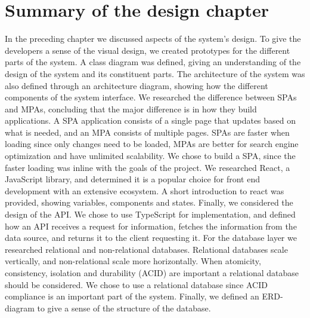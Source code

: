 \section{Summary of the design chapter}
In the preceding chapter we discussed aspects of the system's design.
To give the developers a sense of the visual design, we created prototypes for the different parts of the system.
A class diagram was defined, giving an understanding of the design of the system and its constituent parts.
The architecture of the system was also defined through an architecture diagram, showing how the different components of the system interface.
We researched the difference between SPAs and MPAs, concluding that the major difference is in how they build applications.
A SPA application consists of a single page that updates based on what is needed, and an MPA consists of multiple pages.
SPAs are faster when loading since only changes need to be loaded, MPAs are better for search engine optimization and have unlimited scalability.
We chose to build a SPA, since the faster loading was inline with the goals of the project. 
We researched React, a JavaScript library, and determined it is a popular choice for front end development with an extensive ecosystem.
A short introduction to react was provided, showing variables, components and states.
Finally, we considered the design of the API.
We chose to use TypeScript for implementation, and defined how an API receives a request for information, fetches the information from the data source, and returns it to the client requesting it.
For the database layer we researched relational and non-relational databases.
Relational databases scale vertically, and non-relational scale more horizontally.
When atomicity, consistency, isolation and durability (ACID) are important a relational database should be considered.
We chose to use a relational database since ACID compliance is an important part of the system.
Finally, we defined an ERD-diagram to give a sense of the structure of the database.
